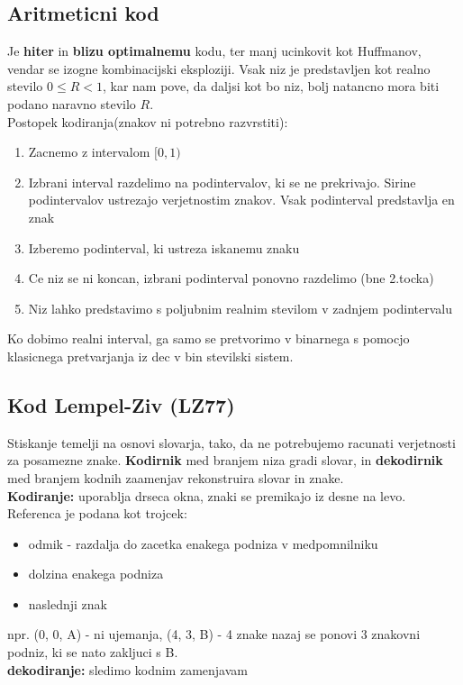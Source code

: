 \documentclass{article}
\begin{document}
\begin{multicols}{3}
\subsection{Aritmeticni kod}
Je \textbf{hiter} in \textbf{blizu optimalnemu} kodu, ter manj ucinkovit kot Huffmanov,
vendar se izogne kombinacijski eksploziji.
Vsak niz je predstavljen kot realno stevilo $0 \leq R < 1$, kar nam pove, da daljsi kot bo niz,
bolj natancno mora biti podano naravno stevilo $R$.\\
Postopek kodiranja(znakov ni potrebno razvrstiti):
\begin{enumerate}
    \item Zacnemo z intervalom $[0, 1)$
    \item Izbrani interval razdelimo na  podintervalov, ki se ne prekrivajo. Sirine podintervalov ustrezajo
        verjetnostim znakov. Vsak podinterval predstavlja en znak
    \item Izberemo podinterval, ki ustreza iskanemu znaku
    \item Ce niz se ni koncan, izbrani podinterval ponovno razdelimo (bne 2.tocka)
    \item Niz lahko predstavimo s poljubnim realnim stevilom v zadnjem podintervalu
\end{enumerate}
Ko dobimo realni interval, ga samo se pretvorimo v binarnega s pomocjo klasicnega pretvarjanja
iz dec v bin stevilski sistem.

\subsection{Kod Lempel-Ziv (LZ77)} 
Stiskanje temelji na osnovi slovarja, tako, da ne potrebujemo
racunati verjetnosti za posamezne znake. \textbf{Kodirnik}
med branjem niza gradi slovar, in \textbf{dekodirnik} med branjem
kodnih zaamenjav rekonstruira slovar in znake.\\
\textbf{Kodiranje:} uporablja drseca okna, znaki se premikajo iz desne na levo.
Referenca je podana kot trojcek:
\begin{itemize}
    \item odmik - razdalja do zacetka enakega podniza v medpomnilniku
    \item dolzina enakega podniza
    \item naslednji znak
\end{itemize}
npr. (0, 0, A) - ni ujemanja, (4, 3, B) - 4 znake nazaj se ponovi 3 znakovni podniz, ki se nato zakljuci s B.\\
\textbf{dekodiranje:} sledimo kodnim zamenjavam


\end{multicols}
\end{document}

